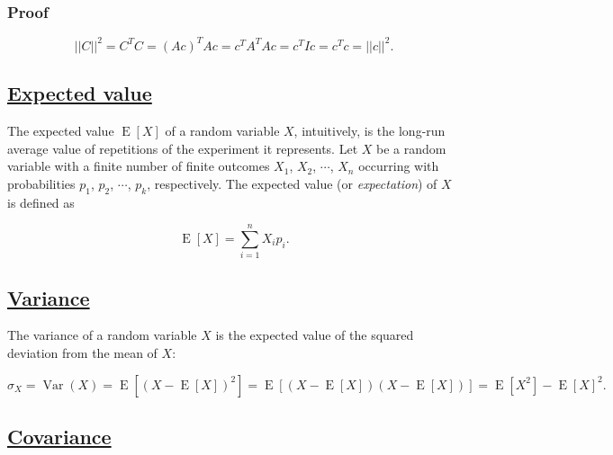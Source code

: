 \hypertarget{proof}{%
\subsubsection{Proof}\label{proof}}

\begin{equation}
    ||C||^2 = C^TC = (Ac)^TAc = c^TA^TAc = c^TIc = c^Tc = ||c||^2.
  \end{equation}

    \hypertarget{expected-value}{%
\subsection{\texorpdfstring{\href{https://en.wikipedia.org/wiki/Expected_value}{Expected
value}}{Expected value}}\label{expected-value}}

The expected value \(\operatorname{E}[X]\) of a random variable \(X\),
intuitively, is the long-run average value of repetitions of the
experiment it represents. Let \(X\) be a random variable with a finite
number of finite outcomes \(X_1\), \(X_2\), \(\cdots\), \(X_n\)
occurring with probabilities \(p_1\), \(p_2\), \(\cdots\), \(p_k\),
respectively. The expected value (or \emph{expectation}) of \(X\) is
defined as

\begin{equation}
  \operatorname{E}[X] = \sum_{i=1}^n X_ip_i.
\end{equation}

    \hypertarget{variance}{%
\subsection{\texorpdfstring{\href{https://en.wikipedia.org/wiki/Variance}{Variance}}{Variance}}\label{variance}}

The variance of a random variable \(X\) is the expected value of the
squared deviation from the mean of \(X\):

\begin{equation}
  \sigma_X=\operatorname{Var}(X) = \operatorname{E}\left[(X - \operatorname{E}[X])^2 \right] = \operatorname{E}\left[(X - \operatorname{E}[X])(X - \operatorname{E}[X]) \right] = \operatorname{E}\left[X^2 \right] - \operatorname{E}[X]^2.
\end{equation}

    \hypertarget{covariance}{%
\subsection{\texorpdfstring{\href{https://en.wikipedia.org/wiki/Covariance}{Covariance}}{Covariance}}\label{covariance}}

